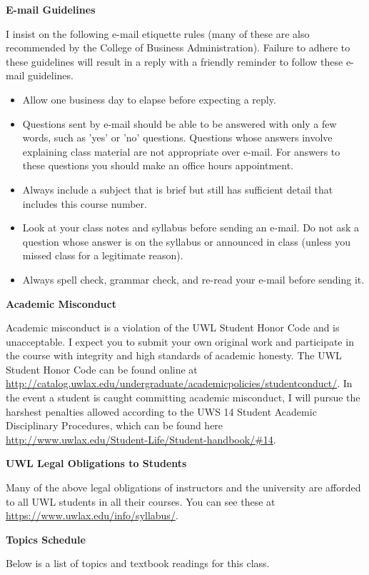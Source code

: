 \documentclass[10pt]{article}
\newcommand{\bulurl}[1]{\url{#1}}
\newcommand{\bi}{\begin{itemize}}
\newcommand{\ei}{\end{itemize}}
\newcommand{\toprule}{\par\vspace*{5pt}\noindent{\hrule\hfill}\par\vspace*{1pt}}
\newcommand{\botrule}{\par\noindent{\hrule\hfill}\par}
\begin{document}
\botrule \textbf{E-mail Guidelines} \toprule
I insist on the following e-mail etiquette rules (many of these are also recommended by the College of Business Administration).  Failure to adhere to these guidelines will result in a reply with a friendly reminder to follow these e-mail guidelines.
\bi
\item Allow one business day to elapse before expecting a reply. 
\item Questions sent by e-mail should be able to be answered with only a few words, such as 'yes' or 'no' questions.  Questions whose answers involve explaining class material are not appropriate over e-mail.  For answers to these questions you should make an office hours appointment.
\item Always include a subject that is brief but still has sufficient detail that includes this course number.
\item Look at your class notes and syllabus before sending an e-mail.  Do not ask a question whose answer is on the syllabus or announced in class (unless you missed class for a legitimate reason).
\item Always spell check, grammar check, and re-read your e-mail before sending it.
  \ei

\botrule \textbf{Academic Misconduct} \toprule
Academic misconduct is a violation of the UWL Student Honor Code and is unacceptable. I expect you to submit your own original work and participate in the course with integrity and high standards of academic honesty.  The UWL Student Honor Code can be found online at \bulurl{http://catalog.uwlax.edu/undergraduate/academicpolicies/studentconduct/}.  In the event a student is caught committing academic misconduct, I will pursue the harshest penalties allowed according to the UWS 14 Student Academic Disciplinary Procedures, which can be found here \bulurl{http://www.uwlax.edu/Student-Life/Student-handbook/\#14}.\\

\botrule \textbf{UWL Legal Obligations to Students} \toprule
Many of the above legal obligations of instructors and the university are afforded to all UWL students in all their courses.  You can see these at \bulurl{https://www.uwlax.edu/info/syllabus/}.\\

\botrule \textbf{Topics Schedule} \toprule
 Below is a list of topics and textbook readings for this class.    \toprule

\newpage

\thispagestyle{empty}
\end{document}
